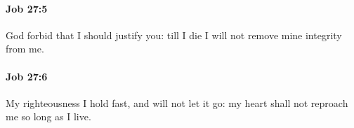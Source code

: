 		\paragraph{Job 27:5} %
			\label{JOB-27-5}

			God forbid that I should justify you: till I die I will not remove mine integrity from me.


		\paragraph{Job 27:6} %
			\label{JOB-27-6}

			My righteousness I hold fast, and will not let it go: my heart shall not reproach me so long as I live.


